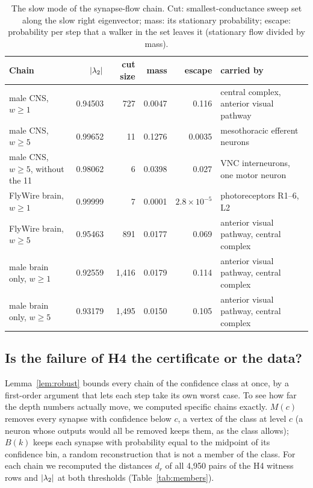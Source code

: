 \begin{table}[t]
\centering
\small
\caption{The slow mode of the synapse-flow chain. Cut: smallest-conductance sweep set along the slow
right eigenvector; mass: its stationary probability; escape: probability per step that a walker in
the set leaves it (stationary flow divided by mass).}
\label{tab:trap}
\begin{tabular}{@{}lrrrr>{\raggedright\arraybackslash}p{3.8cm}@{}}
\toprule
Chain & $\lvert\lambda_2\rvert$ & cut size & mass & escape & carried by \\
\midrule
male CNS, $w\ge1$ & 0.94503 & 727 & 0.0047 & 0.116 & central complex, anterior visual pathway \\
male CNS, $w\ge5$ & 0.99652 & 11 & 0.1276 & 0.0035 & mesothoracic efferent neurons \\
male CNS, $w\ge5$, without the 11 & 0.98062 & 6 & 0.0398 & 0.027 & VNC interneurons, one motor neuron \\
FlyWire brain, $w\ge1$ & 0.99999 & 7 & 0.0001 & $2.8\times10^{-5}$ & photoreceptors R1--6, L2 \\
FlyWire brain, $w\ge5$ & 0.95463 & 891 & 0.0177 & 0.069 & anterior visual pathway, central complex \\
male brain only, $w\ge1$ & 0.92559 & 1{,}416 & 0.0179 & 0.114 & anterior visual pathway, central complex \\
male brain only, $w\ge5$ & 0.93179 & 1{,}495 & 0.0150 & 0.105 & anterior visual pathway, central complex \\
\bottomrule
\end{tabular}
\end{table}

\subsection{Is the failure of H4 the certificate or the data?}\label{sec:members}

Lemma~\ref{lem:robust} bounds every chain of the confidence class at once, by a first-order
argument that lets each step take its own worst case. To see how far the depth numbers actually move,
we computed specific chains exactly. $M(c)$ removes every synapse with confidence below $c$, a vertex
of the class at level $c$ (a neuron whose outputs would all be removed keeps them, as the class
allows); $B(k)$ keeps each synapse with probability equal to the midpoint of its confidence bin, a
random reconstruction that is not a member of the class. For each chain we recomputed the distances
$d_r$ of all 4{,}950 pairs of the H4 witness rows and $\lvert\lambda_2\rvert$ at both thresholds
(Table~\ref{tab:members}).

